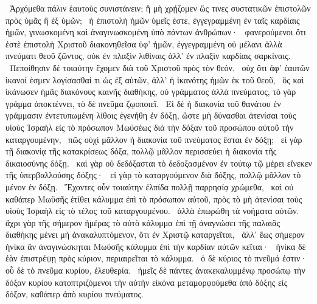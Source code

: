 ~Ἀρχόμεθα πάλιν ἑαυτοὺς συνιστάνειν; ἢ μὴ χρῄζομεν ὥς τινες συστατικῶν ἐπιστολῶν πρὸς ὑμᾶς ἢ ἐξ ὑμῶν;
~ἡ ἐπιστολὴ ἡμῶν ὑμεῖς ἐστε, ἐγγεγραμμένη ἐν ταῖς καρδίαις ἡμῶν, γινωσκομένη καὶ ἀναγινωσκομένη ὑπὸ πάντων ἀνθρώπων·
~φανερούμενοι ὅτι ἐστὲ ἐπιστολὴ Χριστοῦ διακονηθεῖσα ὑφ’ ἡμῶν, ἐγγεγραμμένη οὐ μέλανι ἀλλὰ πνεύματι θεοῦ ζῶντος, οὐκ ἐν πλαξὶν λιθίναις ἀλλ’ ἐν πλαξὶν καρδίαις σαρκίναις.
~Πεποίθησιν δὲ τοιαύτην ἔχομεν διὰ τοῦ Χριστοῦ πρὸς τὸν θεόν.
~οὐχ ὅτι ἀφ’ ἑαυτῶν ἱκανοί ἐσμεν λογίσασθαί τι ὡς ἐξ αὑτῶν, ἀλλ’ ἡ ἱκανότης ἡμῶν ἐκ τοῦ θεοῦ,
~ὃς καὶ ἱκάνωσεν ἡμᾶς διακόνους καινῆς διαθήκης, οὐ γράμματος ἀλλὰ πνεύματος, τὸ γὰρ γράμμα ἀποκτέννει, τὸ δὲ πνεῦμα ζῳοποιεῖ.
~Εἰ δὲ ἡ διακονία τοῦ θανάτου ἐν γράμμασιν ἐντετυπωμένη λίθοις ἐγενήθη ἐν δόξῃ, ὥστε μὴ δύνασθαι ἀτενίσαι τοὺς υἱοὺς Ἰσραὴλ εἰς τὸ πρόσωπον Μωϋσέως διὰ τὴν δόξαν τοῦ προσώπου αὐτοῦ τὴν καταργουμένην,
~πῶς οὐχὶ μᾶλλον ἡ διακονία τοῦ πνεύματος ἔσται ἐν δόξῃ;
~εἰ γὰρ τῇ διακονίᾳ τῆς κατακρίσεως δόξα, πολλῷ μᾶλλον περισσεύει ἡ διακονία τῆς δικαιοσύνης δόξῃ.
~καὶ γὰρ οὐ δεδόξασται τὸ δεδοξασμένον ἐν τούτῳ τῷ μέρει εἵνεκεν τῆς ὑπερβαλλούσης δόξης·
~εἰ γὰρ τὸ καταργούμενον διὰ δόξης, πολλῷ μᾶλλον τὸ μένον ἐν δόξῃ.
~Ἔχοντες οὖν τοιαύτην ἐλπίδα πολλῇ παρρησίᾳ χρώμεθα,
~καὶ οὐ καθάπερ Μωϋσῆς ἐτίθει κάλυμμα ἐπὶ τὸ πρόσωπον αὐτοῦ, πρὸς τὸ μὴ ἀτενίσαι τοὺς υἱοὺς Ἰσραὴλ εἰς τὸ τέλος τοῦ καταργουμένου.
~ἀλλὰ ἐπωρώθη τὰ νοήματα αὐτῶν. ἄχρι γὰρ τῆς σήμερον ἡμέρας τὸ αὐτὸ κάλυμμα ἐπὶ τῇ ἀναγνώσει τῆς παλαιᾶς διαθήκης μένει μὴ ἀνακαλυπτόμενον, ὅτι ἐν Χριστῷ καταργεῖται,
~ἀλλ’ ἕως σήμερον ἡνίκα ἂν ἀναγινώσκηται Μωϋσῆς κάλυμμα ἐπὶ τὴν καρδίαν αὐτῶν κεῖται·
~ἡνίκα δὲ ἐὰν ἐπιστρέψῃ πρὸς κύριον, περιαιρεῖται τὸ κάλυμμα.
~ὁ δὲ κύριος τὸ πνεῦμά ἐστιν· οὗ δὲ τὸ πνεῦμα κυρίου, ἐλευθερία.
~ἡμεῖς δὲ πάντες ἀνακεκαλυμμένῳ προσώπῳ τὴν δόξαν κυρίου κατοπτριζόμενοι τὴν αὐτὴν εἰκόνα μεταμορφούμεθα ἀπὸ δόξης εἰς δόξαν, καθάπερ ἀπὸ κυρίου πνεύματος.

